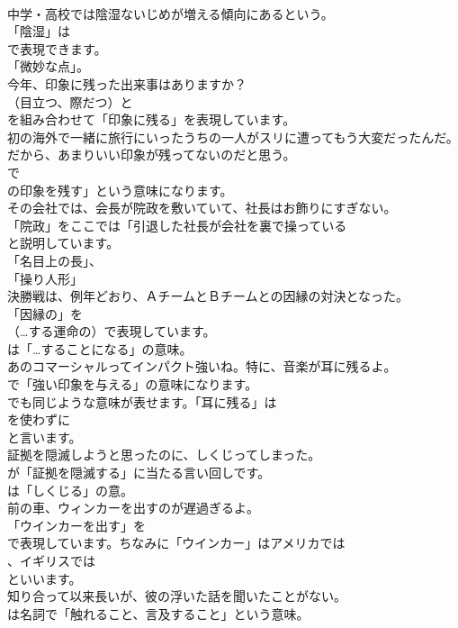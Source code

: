 \documentclass[8pt]{extreport}
\begin{document}
\begin{CJK}{UTF8}{min}
\\	中学・高校では陰湿ないじめが増える傾向にあるという。 
\\	「陰湿」は
\\	で表現できます。
\\	「微妙な点」。	
\\	今年、印象に残った出来事はありますか？ 
\\	（目立つ、際だつ）と
\\	を組み合わせて「印象に残る」を表現しています。	
\\	初の海外で一緒に旅行にいったうちの一人がスリに遭ってもう大変だったんだ。だから、あまりいい印象が残ってないのだと思う。 
\\	で
\\	の印象を残す」という意味になります。	
\\	その会社では、会長が院政を敷いていて、社長はお飾りにすぎない。 
\\	「院政」をここでは「引退した社長が会社を裏で操っている
\\	と説明しています。
\\	「名目上の長」、
\\	「操り人形」	
\\	決勝戦は、例年どおり、ＡチームとＢチームとの因縁の対決となった。 
\\	「因縁の」を
\\	（…する運命の）で表現しています。
\\	は「…することになる」の意味。	
\\	あのコマーシャルってインパクト強いね。特に、音楽が耳に残るよ。 
\\	で「強い印象を与える」の意味になります。
\\	でも同じような意味が表せます。「耳に残る」は
\\	を使わずに
\\	と言います。	
\\	証拠を隠滅しようと思ったのに、しくじってしまった。 
\\	が「証拠を隠滅する」に当たる言い回しです。
\\	は「しくじる」の意。	
\\	前の車、ウィンカーを出すのが遅過ぎるよ。 
\\	「ウインカーを出す」を
\\	で表現しています。ちなみに「ウインカー」はアメリカでは
\\	、イギリスでは
\\	といいます。	
\\	知り合って以来長いが、彼の浮いた話を聞いたことがない。 
\\	は名詞で「触れること、言及すること」という意味。

\end{CJK}
\end{document}
